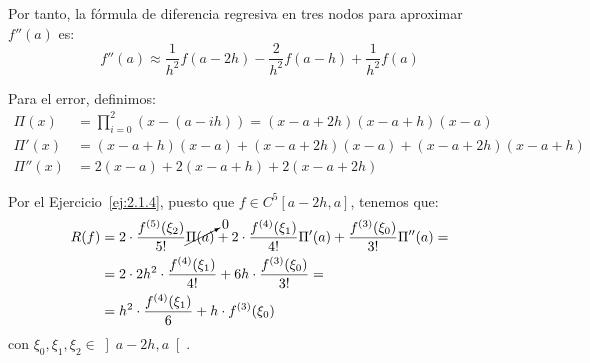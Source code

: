 \begin{ejercicio}
    Por tanto, la fórmula de diferencia regresiva en tres nodos para aproximar $f''(a)$ es:
    \[
    f''(a) \approx \frac{1}{h^2}f(a - 2h) - \frac{2}{h^2}f(a - h) + \frac{1}{h^2}f(a)
    \]

    Para el error, definimos:
    \begin{align*}
        \Pi(x) &= \prod_{i=0}^{2}(x - (a - ih)) = (x - a + 2h)(x - a + h)(x - a)\\
        \Pi'(x) &= (x-a+h)(x-a) + (x-a+2h)(x-a) + (x-a+2h)(x-a+h)\\
        \Pi''(x) &= 2(x-a) + 2(x-a+h) + 2(x-a+2h)
    \end{align*}

    Por el Ejercicio~\ref{ej:2.1.4}, puesto que $f \in C^5[a - 2h, a]$, tenemos que:
    \begin{align*}
        R(f) &= 2\cdot \frac{f^{(5)}(\xi_2)}{5!}\cancelto{0}{\Pi(a)} + 2\cdot \frac{f^{(4)}(\xi_1)}{4!}\Pi'(a) + \frac{f^{(3)}(\xi_0)}{3!}\Pi''(a)
        =\\&=2\cdot 2h^2\cdot \frac{f^{(4)}(\xi_1)}{4!} + 6h\cdot \frac{f^{(3)}(\xi_0)}{3!}
        =\\&=h^2\cdot \frac{f^{(4)}(\xi_1)}{6} + h\cdot f^{(3)}(\xi_0)
    \end{align*}
    con $\xi_0, \xi_1, \xi_2 \in \left] a-2h, a \right[$.
\end{ejercicio}

